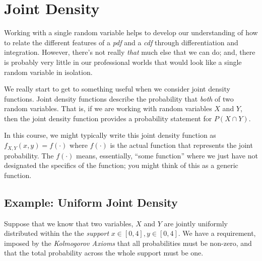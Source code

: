 \documentclass[
]{book}
\theoremstyle{definition}
\theoremstyle{definition}
\theoremstyle{definition}
\theoremstyle{definition}
\theoremstyle{remark}
\begin{document}
\hypertarget{joint-density}{%
\section{Joint Density}\label{joint-density}}

Working with a single random variable helps to develop our understanding of how to relate the different features of a \emph{pdf} and a \emph{cdf} through differentiation and integration. However, there's not really \emph{that} much else that we can do; and, there is probably very little in our professional worlds that would look like a single random variable in isolation.

We really start to get to something useful when we consider joint density functions. Joint density functions describe the probability that \emph{both} of two random variables. That is, if we are working with random variables \(X\) and \(Y\), then the joint density function provides a probability statement for \(P(X \cap Y)\).

In this course, we might typically write this joint density function as \(f_{X,Y}(x,y) = f(\cdot)\) where \(f(\cdot)\) is the actual function that represents the joint probability. The \(f(\cdot)\) means, essentially, ``some function'' where we just have not designated the specifics of the function; you might think of this as a generic function.

\hypertarget{example-uniform-joint-density}{%
\subsection{Example: Uniform Joint Density}\label{example-uniform-joint-density}}

Suppose that we know that two variables, \(X\) and \(Y\) are jointly uniformly distributed within the the \emph{support} \(x \in [0,4], y \in [0,4]\). We have a requirement, imposed by the \emph{Kolmogorov Axioms} that all probabilities must be non-zero, and that the total probability across the whole support must be one.
\end{document}
